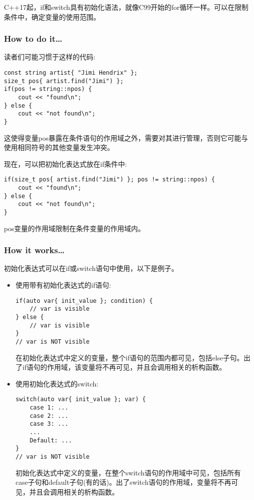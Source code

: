 
C++17起，if和switch具有初始化语法，就像C99开始的for循环一样。可以在限制条件中，确定变量的使用范围。

\subsubsection{How to do it…}

读者们可能习惯于这样的代码:

\begin{lstlisting}[style=styleCXX]
const string artist{ "Jimi Hendrix" };
size_t pos{ artist.find("Jimi") };
if(pos != string::npos) {
	cout << "found\n";
} else {
	cout << "not found\n";
}
\end{lstlisting}

这使得变量pos暴露在条件语句的作用域之外，需要对其进行管理，否则它可能与使用相同符号的其他变量发生冲突。

现在，可以把初始化表达式放在if条件中:

\begin{lstlisting}[style=styleCXX]
if(size_t pos{ artist.find("Jimi") }; pos != string::npos) {
	cout << "found\n";
} else {
	cout << "not found\n";
}
\end{lstlisting}

pos变量的作用域限制在条件变量的作用域内。

\subsubsection{How it works…}

初始化表达式可以在if或switch语句中使用，以下是例子。

\begin{itemize}
\item 
使用带有初始化表达式的if语句:

\begin{lstlisting}[style=styleCXX]
if(auto var{ init_value }; condition) {
	// var is visible
} else {
	// var is visible
}
// var is NOT visible
\end{lstlisting}

在初始化表达式中定义的变量，整个if语句的范围内都可见，包括else子句。出了if语句的作用域，该变量将不再可见，并且会调用相关的析构函数。

\item 
使用初始化表达式的switch:

\begin{lstlisting}[style=styleCXX]
switch(auto var{ init_value }; var) {
	case 1: ...
	case 2: ...
	case 3: ...
	...
	Default: ...
}
// var is NOT visible
\end{lstlisting}

初始化表达式中定义的变量，在整个switch语句的作用域中可见，包括所有case子句和default子句(有的话)。出了switch语句的作用域，变量将不再可见，并且会调用相关的析构函数。

\end{itemize}

